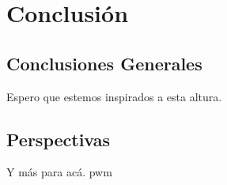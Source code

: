\chapter{Conclusión}
\label{ch:conclusion}

\section{Conclusiones Generales}
Espero que estemos inspirados a esta altura. \cite{Gardner}


\section{Perspectivas}
Y más para acá. \gls{pwm}

